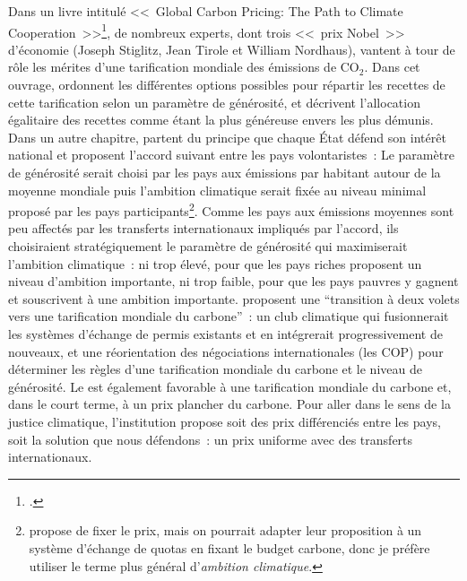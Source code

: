\documentclass[a5paper,french]{memoir}
\begin{document}
Dans un livre intitulé <<~Global Carbon Pricing: The Path to Climate Cooperation~>>\footnote{\citet{cramton_global_2017}.}, de nombreux experts, dont trois <<~prix Nobel~>> d'économie (Joseph Stiglitz, Jean Tirole et William Nordhaus), vantent à tour de rôle les mérites d'une tarification mondiale des émissions de CO$_\text{2}$. Dans cet ouvrage, \citet{gollier_negotiating_2015} ordonnent les différentes options possibles pour répartir les recettes de cette tarification selon un paramètre de générosité, et décrivent l'allocation égalitaire des recettes comme étant la plus généreuse envers les plus démunis. %
Dans un autre chapitre, \citet{cramton_international_2015} partent du principe que chaque État défend son intérêt national et proposent l'accord suivant entre les pays %
volontaristes~: Le paramètre de générosité serait choisi par les pays aux émissions par habitant autour de la moyenne mondiale puis l'ambition climatique serait fixée au niveau minimal proposé par les pays participants\footnote{\citet{cramton_international_2015} propose de fixer le prix, mais on pourrait adapter leur proposition à un système d'échange de quotas en fixant le budget carbone, donc je préfère utiliser le terme plus général d'\textit{ambition climatique}.}. Comme les pays aux émissions moyennes sont peu affectés par les transferts internationaux impliqués par l'accord, ils choisiraient stratégiquement le paramètre de générosité qui maximiserait l'ambition climatique~: ni trop élevé, pour que les pays riches proposent un niveau d'ambition importante, ni trop faible, pour que les pays pauvres y gagnent et souscrivent à une ambition importante. \citet{van_den_berg_implications_2020} proposent une ``transition à deux volets vers une tarification mondiale du carbone''~: un club climatique qui fusionnerait les systèmes d'échange de permis existants et en intégrerait progressivement de nouveaux, et une réorientation des négociations internationales (les COP) pour déterminer les règles d'une tarification mondiale du carbone et le niveau de générosité. Le \citet{imf_how_2019} est également favorable à une tarification mondiale du carbone et, dans le court terme, à un prix plancher du carbone. Pour aller dans le sens de la justice climatique, l'institution propose soit des prix différenciés entre les pays, soit la solution que nous défendons~: un prix uniforme avec des transferts internationaux. 

\end{document}
